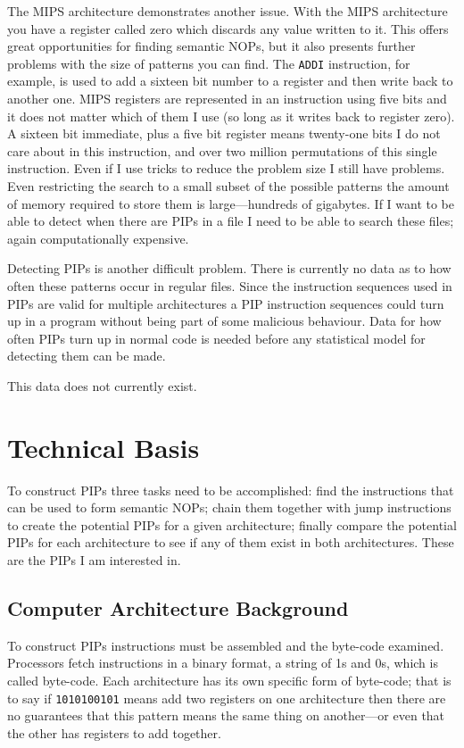 \documentclass[10pt]{book}
\begin{document}
The MIPS architecture demonstrates another issue. With the MIPS
architecture you have a register called zero which discards any value
written to it. This offers great opportunities for finding semantic
NOPs, but it also presents further problems with the size of patterns
you can find. The \lstinline!ADDI! instruction, for example, is used to
add a sixteen bit number to a register and then write back to another
one. MIPS registers are represented in an instruction using five bits
and it does not matter which of them I use (so long as it writes back to
register zero). A sixteen bit immediate, plus a five bit register means
twenty-one bits I do not care about in this instruction, and over two
million permutations of this single instruction. Even if I use tricks to
reduce the problem size I still have problems. Even restricting the
search to a small subset of the possible patterns the amount of memory
required to store them is large---hundreds of gigabytes. If I want to be
able to detect when there are PIPs in a file I need to be able to search
these files; again computationally expensive.

Detecting PIPs is another difficult problem. There is currently no data
as to how often these patterns occur in regular files. Since the
instruction sequences used in PIPs are valid for multiple architectures
a PIP instruction sequences could turn up in a program without being
part of some malicious behaviour. Data for how often PIPs turn up in
normal code is needed before any statistical model for detecting them
can be made.

This data does not currently exist.

\chapter{Technical Basis}

To construct PIPs three tasks need to be accomplished: find the
instructions that can be used to form semantic NOPs; chain them together
with jump instructions to create the potential PIPs for a given
architecture; finally compare the potential PIPs for each architecture
to see if any of them exist in both architectures. These are the PIPs I
am interested in.

\section{Computer Architecture Background}

To construct PIPs instructions must be assembled and the byte-code
examined. Processors fetch instructions in a binary format, a string of
1s and 0s, which is called byte-code. Each architecture has its own
specific form of byte-code; that is to say if \lstinline!1010100101!
means add two registers on one architecture then there are no guarantees
that this pattern means the same thing on another---or even that the
other has registers to add together.
\end{document}
